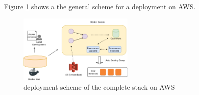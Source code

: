 Figure \ref{fig:finaldeployment} shows a the general scheme for a deployment on AWS.

\begin{figure}[H]
	\center
	\includegraphics[width=0.5\textwidth]{figures/deployment2.png}
	\caption{deployment scheme of the complete stack on AWS}
	\label{fig:finaldeployment}
\end{figure}